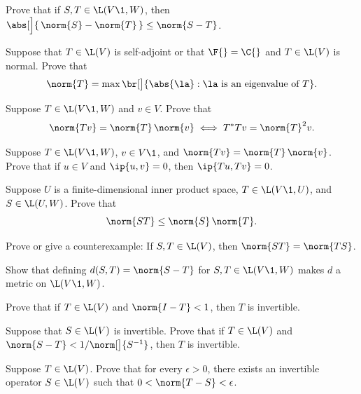 
\exercise
Prove that if $S, T \in \L(V\1, W)$, then $\abs[\Big]{\, \norm{S} - \norm{T} \,} \le \norm{S-T}$. \label{5reverse}


\exercise
Suppose that $T \in \L(V)$ is self-adjoint or that $\F{}= \C{}$ and $T \in \L(V)$ is normal. Prove that
\[
\norm{T} = \max \br[\big]{ \abs{\la} : \la \text{ is an eigenvalue of } T}.
\]
\exercisedisplayend


\exercise
Suppose $T \in \L(V\1, W)$ and $v \in V$. Prove that\label{7eq}
\[
\norm{Tv} = \norm{T} \, \norm{v} \iff T^*T v = \norm{T}^2 v.
\]
\exercisedisplayend


\exercise
Suppose $T \in \L(V\1, W)$, $v \in V\1$, and $\norm{Tv} = \norm{T} \, \norm{v}$. Prove that if $u \in V$ and $\ip{u, v} = 0$, then
$\ip{Tu, Tv} = 0$.


\exercise
Suppose $U$ is a finite-dimensional inner product space, $T \in \L(V\1, U)$, and $S \in \L(U, W)$. Prove that \label{2prod}
\[
\norm{ST} \le \norm{S} \, \norm{T}.
\]
\exercisedisplayend


\exercise
Prove or give a counterexample: If $S, T \in \L(V)$, then $\norm{ST} = \norm{TS}$.


\exercise
Show that defining $d(S, T) = \norm{S-T}$ for $S, T \in \L(V\1, W)$ makes $d$ a metric on $\L(V\1, W)$.\label{7met}


\exercise
\begin{SUBtheorem}
\item
Prove that if $T \in \L(V)$ and $\norm{I - T} < 1$, then $T$ is invertible.
\item
Suppose that $S \in \L(V)$ is invertible. Prove that if $T \in \L(V)$ and $\norm{S - T} < 1/\norm[\big]{S^{-1}}$, then $T$ is invertible.
\end{SUBtheorem}

\exercise
Suppose $T \in \L(V)$. Prove that for every $\epsilon > 0$, there exists an invertible operator $S \in \L(V)$ such that
$0 < \norm{T - S} < \epsilon$. \label{7invert}


